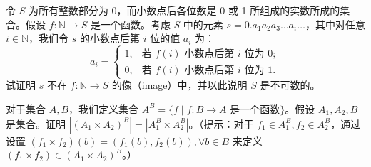 \begin{problemset}
    \item 令 $S$ 为所有整数部分为 0，而小数点后各位数是 0 或 1 所组成的实数所成的集合。假设 $f : \mathbb{N} \to S$ 是一个函数。考虑 $S$ 中的元素 $s = 0.a_1a_2a_3 \dots a_i \dots$，其中对任意 $i \in \mathbb{N}$，我们令 $s$ 的小数点后第 $i$ 位的值 $a_i$ 为：
    $$ a_i = \begin{cases} 1, & \text{若 } f(i) \text{ 小数点后第 } i \text{ 位为 } 0; \\ 0, & \text{若 } f(i) \text{ 小数点后第 } i \text{ 位为 } 1. \end{cases} $$
    试证明 $s$ 不在 $f : \mathbb{N} \to S$ 的像（image）中，并以此说明 $S$ 是不可数的。

    \item 对于集合 $A, B$，我们定义集合 $A^B = \{f \mid f : B \to A \text{ 是一个函数}\}$。假设 $A_1, A_2, B$ 是集合。证明 $|(A_1 \times A_2)^B| = |A_1^B \times A_2^B|$。（提示：对于 $f_1 \in A_1^B, f_2 \in A_2^B$，通过设置 $(f_1 \times f_2)(b) = (f_1(b), f_2(b)), \forall b \in B$ 来定义 $(f_1 \times f_2) \in (A_1 \times A_2)^B$。）
\end{problemset}

